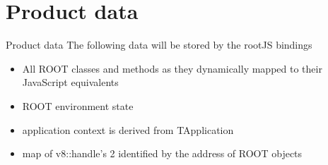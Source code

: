\section{Product data}
\begin{frame}{Product data}
	The following data will be stored by the rootJS bindings
	\begin{itemize}
		\item All ROOT classes and methods as they dynamically mapped to their JavaScript equivalents
		\item ROOT environment state 
		\item application context is derived from TApplication
		\item map of v8::handle’s 2 identified by the address of ROOT objects
	\end{itemize}
\end{frame}
